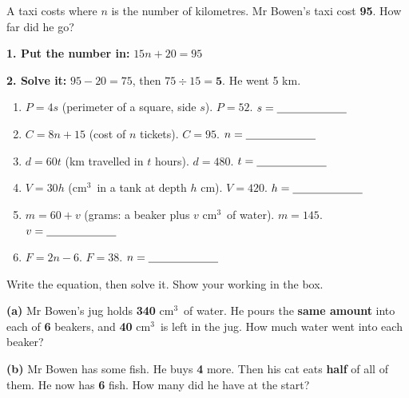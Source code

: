 \documentclass[12pt,a4paper]{article}
\newcommand{\ccm}{\ensuremath{\mathrm{cm^3}}}
\begin{document}
\begin{remember}
  A taxi costs \;  \; where $n$ is the number of kilometres.
  Mr Bowen's taxi cost \textbf{95}. How far did he go?

  \medskip
  \hspace*{1.2em}\textbf{1. Put the number in:} \quad $15n + 20 = 95$

  \smallskip
  \hspace*{1.2em}\textbf{2. Solve it:} \quad $95 - 20 = 75$, \; then
  $75 \div 15 = \mathbf{5}$. \quad He went 5 km.
\end{remember}

\vspace{2pt}
\begin{enumerate}[label=(\alph*), itemsep=10pt]
  \item $P = 4s$ \; (perimeter of a square, side $s$). \; $P = 52$.
        \hfill $s = \blank[2.2cm]$
  \item $C = 8n + 15$ \; (cost of $n$ tickets). \; $C = 95$.
        \hfill $n = \blank[2.2cm]$
  \item $d = 60t$ \; (km travelled in $t$ hours). \; $d = 480$.
        \hfill $t = \blank[2.2cm]$
  \item $V = 30h$ \; (\ccm\ in a tank at depth $h$ cm). \; $V = 420$.
        \hfill $h = \blank[2.2cm]$
  \item $m = 60 + v$ \; (grams: a beaker plus $v$ \ccm\ of water). \; $m = 145$.
        \hfill $v = \blank[2.2cm]$
  \item $F = 2n - 6$. \; $F = 38$.
        \hfill $n = \blank[2.2cm]$
\end{enumerate}


\noindent Write the equation, then solve it. Show your working in the box.

\vspace{4pt}
\noindent \textbf{(a)} Mr Bowen's jug holds \textbf{340} \ccm\ of water. He pours the
\textbf{same amount} into each of \textbf{6} beakers, and \textbf{40} \ccm\ is left in
the jug. How much water went into each beaker?

\begin{workspace}[2.3cm]\end{workspace}

\noindent \textbf{(b)} Mr Bowen has some fish. He buys \textbf{4} more. Then his cat
eats \textbf{half} of all of them. He now has \textbf{6} fish. How many did he have at
the start?
\end{document}
